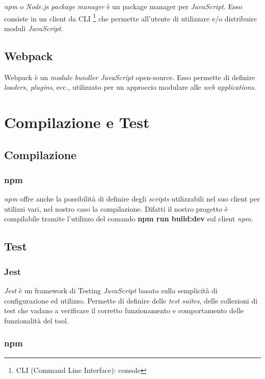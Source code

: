 \documentclass[twoside]{supsistudent}
\begin{document}
\textit{npm} o \textit{Node.js package manager} è un package manager per 
\textit{JavaScript}. Esso consiste in un client da CLI 
\footnote{CLI (Command Line Interface): console}
che permette all'utente di utilizzare e/o distribuire moduli 
\textit{JavaScript}.

\subsection{Webpack}

Webpack è un \textit{module bundler JavaScript} open-source. Esso permette di 
definire \textit{loaders, plugins}, ecc., utilizzato per un approccio modulare
alle \textit{web applications}.

\section{Compilazione e Test}

\subsection{Compilazione}

\subsubsection{npm}

\textit{npm} offre anche la possibilità di definire degli \textit{scripts}
utilizzabili nel suo client per utilizzi vari, nel nostro caso la compilazione.
Difatti il nostro progetto è compilabile tramite l'utilizzo del comando
\textbf{npm run build:dev} sul client \textit{npm}.

\subsection{Test}

\subsubsection{Jest}

\textit{Jest} è un framework di Testing \textit{JavaScript} basato sulla
semplicità di configurazione ed utilizzo. Permette di definire delle 
\textit{test suites}, delle collezioni di test che vadano a verificare il
corretto funzionamento e comportamento delle funzionalità del tool.

\subsubsection{npm}
\end{document}
